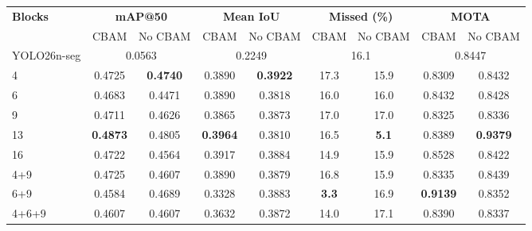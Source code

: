 
\begin{table}[ht]
\begin{center}
\begin{tabular}{l cc cc cc cc}
\toprule
\multirow{2}{*}{\textbf{Blocks}}
  & \multicolumn{2}{c}{\textbf{mAP@50}}
  & \multicolumn{2}{c}{\textbf{Mean IoU}}
  & \multicolumn{2}{c}{\textbf{Missed (\%)}}
  & \multicolumn{2}{c}{\textbf{MOTA}} \\
\cmidrule(lr){2-3} \cmidrule(lr){4-5} \cmidrule(lr){6-7} \cmidrule(lr){8-9}
  & CBAM & No CBAM & CBAM & No CBAM & CBAM & No CBAM & CBAM & No CBAM \\
\midrule
YOLO26n-seg & \multicolumn{2}{c}{0.0563} & \multicolumn{2}{c}{0.2249} & \multicolumn{2}{c}{16.1} & \multicolumn{2}{c}{0.8447} \\
\midrule
4                & 0.4725          & \textbf{0.4740} & 0.3890          & \textbf{0.3922} & 17.3          & 15.9          & 0.8309          & 0.8432          \\
6                & 0.4683          & 0.4471          & 0.3890          & 0.3818          & 16.0          & 16.0          & 0.8432          & 0.8428          \\
9                & 0.4711          & 0.4626          & 0.3865          & 0.3873          & 17.0          & 17.0          & 0.8325          & 0.8336          \\
\midrule
13               & \textbf{0.4873} & 0.4805          & \textbf{0.3964} & 0.3810          & 16.5          & \textbf{5.1}  & 0.8389          & \textbf{0.9379} \\
16               & 0.4722          & 0.4564          & 0.3917          & 0.3884          & 14.9          & 15.9          & 0.8528          & 0.8422          \\
4+9              & 0.4725          & 0.4607          & 0.3890          & 0.3879          & 16.8          & 15.9          & 0.8335          & 0.8439          \\
6+9              & 0.4584          & 0.4689          & 0.3328          & 0.3883          & \textbf{3.3}  & 16.9          & \textbf{0.9139} & 0.8352          \\
\midrule
4+6+9            & 0.4607          & 0.4607          & 0.3632          & 0.3872          & 14.0          & 17.1          & 0.8390          & 0.8337          \\

\end{tabular}
\end{center}
\end{table}
